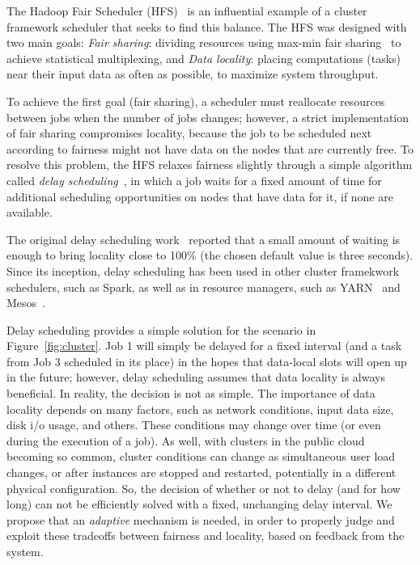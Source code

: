 The Hadoop Fair Scheduler (HFS)~\cite{Zaharia:EECS} is an influential example of a cluster framework 
scheduler that seeks to find this balance. The HFS was designed with two main goals: 
\textit{Fair sharing}: dividing resources using max-min fair sharing~\cite{Zaharia2008} to achieve 
statistical multiplexing, and 
\textit{Data locality}: placing computations (tasks) near their input data as often as
possible, to maximize system throughput. 

To achieve the first goal (fair sharing), a scheduler must reallocate resources between 
jobs when the number of jobs changes; however, a strict implementation of fair sharing 
compromises locality, because the job to be scheduled next according to fairness might not
have data on the nodes that are currently free. To resolve this problem, the HFS relaxes 
fairness slightly through a simple algorithm called 
\textit{delay scheduling}~\cite{Zaharia2010}, in which a 
job waits for a fixed amount of time for additional scheduling opportunities on nodes 
that have data for it, if none are available.

The original delay scheduling work~\cite{Zaharia2010} reported that a small amount of waiting is enough
to bring locality close to 100\% (the chosen default value is three seconds). Since its 
inception, delay scheduling has been used in other cluster framekwork schedulers, such as 
Spark, as well as in resource managers, such as YARN~\cite{Vavilapalli2013} and
Mesos~\cite{Hindman2011}.

Delay scheduling provides a simple solution for the scenario in 
Figure~\ref{fig:cluster}. Job 1 will simply be delayed for a fixed interval (and a task
from Job 3 scheduled in its place) in the hopes that data-local slots will open up in 
the future; however, delay scheduling assumes that data locality is always beneficial.
In reality, the decision is not as simple. The importance of data locality depends on many
factors, such as network conditions, input data size, disk i/o usage, and others. These
conditions may change over time (or even during the execution of a job). As well, with clusters
in the public cloud becoming so common, cluster conditions can change as simultaneous user
load changes, or after instances are stopped and restarted, potentially in a different physical
configuration. So, the
decision of whether or not to delay (and for how long) can not be efficiently solved with
a fixed, unchanging delay interval. We propose that an \emph{adaptive} mechanism is needed,
in order to properly judge and exploit these tradeoffs between fairness and locality,
based on feedback from the system.

